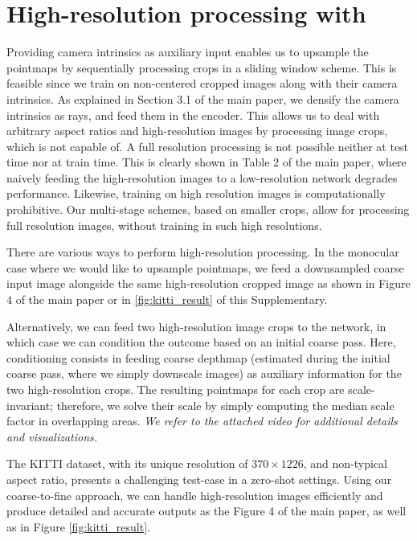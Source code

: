 \section{High-resolution processing with \ours{}}

Providing camera intrinsics as auxiliary input enables us to upsample the pointmaps by sequentially processing crops in a sliding window scheme. This is feasible since we train on non-centered cropped images along with their camera intrinsics.
As explained in Section 3.1 of the main paper, we densify the camera intrinsics as rays, and feed them in the encoder.
This allows us to deal with arbitrary aspect ratios and high-resolution images by processing image crops, which \duster{} is not capable of. A full resolution processing is not possible neither at test time nor at train time. This is clearly shown in Table 2 of the main paper, where naively feeding the high-resolution images to a low-resolution network degrades performance. Likewise, training on high resolution images is computationally prohibitive. Our multi-stage schemes, based on smaller crops, allow for processing full resolution images, without training in such high resolutions. 

There are various ways to perform high-resolution processing.
In the monocular case where we would like to upsample pointmaps, we feed a downsampled coarse input image alongside the same high-resolution cropped image as shown in Figure 4 of the main paper or in \cref{fig:kitti_result} of this Supplementary.

Alternatively, we can feed two high-resolution image crops to the network, in which case we can condition the outcome based on an initial coarse pass.
Here, conditioning consists in feeding coarse depthmap (estimated during the initial coarse pass, where we simply downscale images) as auxiliary information for the two high-resolution crops.
The resulting pointmaps for each crop are scale-invariant; therefore, we solve their scale by simply computing the median scale factor in overlapping areas.
\emph{We refer to the attached video for additional details and visualizations.}



The KITTI dataset, with its unique resolution of $370\times1226$, and non-typical aspect ratio, presents a challenging test-case in a zero-shot settings. 
Using our coarse-to-fine approach, we can handle high-resolution images efficiently and produce detailed and accurate outputs as the Figure 4 of the main paper, as well as in Figure \ref{fig:kitti_result}.


